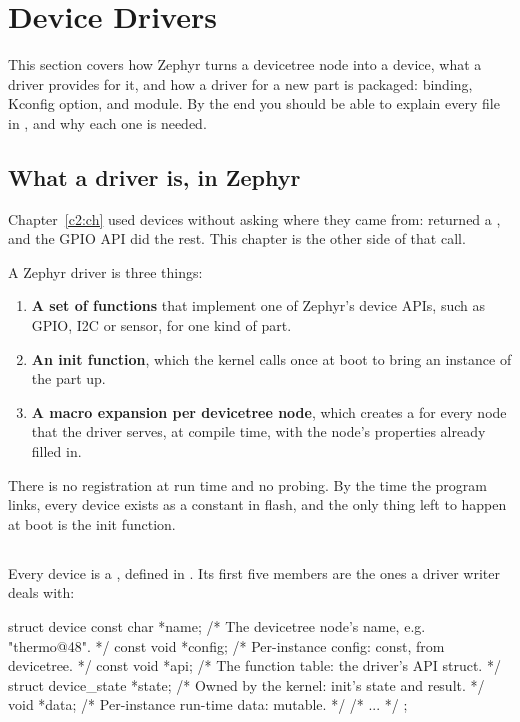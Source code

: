
\section{Device Drivers}
\label{c5:sec:devicedrivers}\label{c5:app:a}
This section covers how Zephyr turns a devicetree node into a device, what a driver provides for it,
and how a driver for a new part is packaged: binding, Kconfig option, and module. By the end you
should be able to explain every file in , and why each one
is needed.

\subsection{What a driver is, in Zephyr}
Chapter~\ref{c2:ch} used devices without asking where they came from:
 returned a , and the GPIO API did
the rest. This chapter is the other side of that call.

A Zephyr driver is three things:

\begin{enumerate}
  \item \textbf{A set of functions} that implement one of Zephyr’s device APIs, such as GPIO, I2C or sensor,
    for one kind of part.
  \item \textbf{An init function}, which the kernel calls once at boot to bring an instance of the part up.
  \item \textbf{A macro expansion per devicetree node}, which creates a  for every node
    that the driver serves, at compile time, with the node’s properties already filled in.
\end{enumerate}

There is no registration at run time and no probing. By the time the program links, every device
exists as a constant in flash, and the only thing left to happen at boot is the init function.

\subsection{}
Every device is a , defined in . Its first five members
are the ones a driver writer deals with:

\begin{ccode}
struct device {
	const char *name;           /* The devicetree node's name, e.g. "thermo@48". */
	const void *config;         /* Per-instance config: const, from devicetree. */
	const void *api;            /* The function table: the driver's API struct. */
	struct device_state *state; /* Owned by the kernel: init's state and result. */
	void *data;                 /* Per-instance run-time data: mutable. */
	/* ... */
};
\end{ccode}

